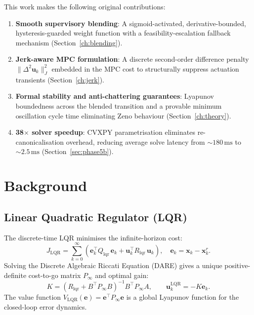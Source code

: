 \documentclass[12pt,a4paper,oneside]{report}
\begin{document}
This work makes the following original contributions:
\begin{enumerate}
  \item \textbf{Smooth supervisory blending}: A sigmoid-activated,
    derivative-bounded, hysteresis-guarded weight function with a
    feasibility-escalation fallback mechanism (Section~\ref{ch:blending}).
  \item \textbf{Jerk-aware MPC formulation}: A discrete second-order
    difference penalty \(\|\Delta^2\mathbf{u}_k\|_J^2\) embedded in the
    MPC cost to structurally suppress actuation transients
    (Section~\ref{ch:jerk}).
  \item \textbf{Formal stability and anti-chattering guarantees}: Lyapunov
    boundedness across the blended transition and a provable minimum
    oscillation cycle time eliminating Zeno behaviour
    (Section~\ref{ch:theory}).
  \item \textbf{38$\times$ solver speedup}: CVXPY parametrisation
    eliminates re-canonicalisation overhead, reducing average solve
    latency from \(\sim\!180\,\text{ms}\) to \(\sim\!2.5\,\text{ms}\)
    (Section~\ref{sec:phase5b}).
\end{enumerate}

\chapter{Background}\label{ch:background}

\section{Linear Quadratic Regulator (LQR)}

The discrete-time LQR minimises the infinite-horizon cost:
\begin{equation}
  J_{\mathrm{LQR}} = \sum_{k=0}^{\infty}
    \left(\mathbf{e}_k^\top Q_{\mathrm{lqr}}\,\mathbf{e}_k +
          \mathbf{u}_k^\top R_{\mathrm{lqr}}\,\mathbf{u}_k\right),\quad
  \mathbf{e}_k = \mathbf{x}_k - \mathbf{x}^r_k.
\end{equation}
Solving the Discrete Algebraic Riccati Equation (DARE) gives a unique
positive-definite cost-to-go matrix \(P_\infty\) and optimal gain:
\begin{equation}
  K = (R_{\mathrm{lqr}} + B^\top P_\infty B)^{-1}B^\top P_\infty A,\qquad
  \mathbf{u}^{\mathrm{LQR}}_k = -K\mathbf{e}_k.
\end{equation}
The value function \(V_{\mathrm{LQR}}(\mathbf{e}) = \mathbf{e}^\top P_\infty
\mathbf{e}\) is a global Lyapunov function for the closed-loop error dynamics.
\end{document}
